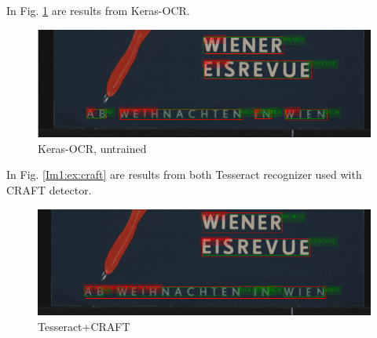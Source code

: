 In Fig. \ref{Im2:ex:keras} are results from Keras-OCR. 
\begin{figure}[hbtp!]
    \centering
    \includegraphics[scale=0.36]{obrazky/plakaty/result_kerasOCR_vienna1_nosplit_nocorrection-21.png}
    \caption{Keras-OCR, untrained}
    \label{Im2:ex:keras}
\end{figure}

In Fig. \ref{Im1:ex:craft} are results from both Tesseract recognizer used with CRAFT detector.
\begin{figure}[hbtp!]
    \centering
    \includegraphics[scale=0.36]{obrazky/plakaty/result_carfttesseract_vienna1_split-21.png}
    \caption{Tesseract+CRAFT}
    \label{Im2:ex:Craft}
\end{figure}

